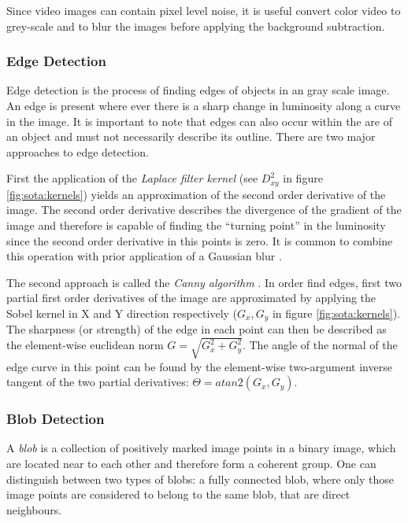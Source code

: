 Since video images can contain pixel level noise, it is useful convert color video to grey-scale and to blur the images before applying the background subtraction.

\subsubsection{Edge Detection}

Edge detection is the process of finding edges of objects in an gray scale image.
An edge is present where ever there is a sharp change in luminosity along a curve in the image.
It is important to note that edges can also occur within the are of an object and must not necessarily describe its outline.
There are two major approaches to edge detection.

First the application of the \emph{Laplace filter kernel} (see $ D_{xy}^{2} $ in figure \ref{fig:sota:kernels}) yields an approximation of the second order derivative of the image.
The second order derivative describes the divergence of the gradient of the image and therefore is capable of finding the \enquote{turning point} in the luminosity since the second order derivative in this points is zero. It is common to combine this operation with prior application of a Gaussian blur \autocite[][pp.~237f.]{szeliski2010algorithms}.

The second approach is called the \emph{Canny algorithm} \autocite[][]{canny1986edge}.
In order find edges, first two partial first order derivatives of the image are approximated by applying the Sobel kernel in X and Y direction respectively ($ G_x , G_y $ in figure \ref{fig:sota:kernels}). 
The sharpness (or strength) of the edge in each point can then be described as the element-wise euclidean norm $ G = \sqrt{G_x^2 + G_y^2} $.
The angle of the normal of the edge curve in this point can be found by the element-wise two-argument inverse tangent of the two partial derivatives: $ \Theta = atan2(G_x, G_y) $.

\subsubsection{Blob Detection}

A \emph{blob} is a collection of positively marked image points in a binary image, which are located near to each other and therefore form a coherent group.
One can distinguish between two types of blobs:
a fully connected blob, 
where only those image points are considered to belong to the same blob, that are direct neighbours.


